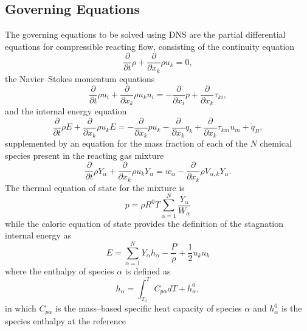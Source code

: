\documentclass[dvips]{article}
\begin{document}
\subsection{Governing Equations}
The governing equations to be solved using DNS are the partial
differential equations for compressible reacting flow,
consisting of the continuity equation
\begin{equation}
\frac{\partial}{\partial t}\rho +
\frac{\partial}{\partial x_{k}}\rho u_{k} = 0,
\label{CONTINUITY}
\end{equation}
the Navier--Stokes momentum equations
\begin{equation}
\frac{\partial}{\partial t}\rho u_{i} +
\frac{\partial}{\partial x_{k}}\rho u_{k} u_{i} =
-\frac{\partial}{\partial x_{i}}p +
\frac{\partial}{\partial x_{k}} \tau_{ki},
\label{MOMENTUM}
\end{equation}
and the internal energy equation
\begin{equation}
\frac{\partial}{\partial t}\rho E +
\frac{\partial}{\partial x_{k}}\rho u_{k} E =
-\frac{\partial}{\partial x_{k}}p u_{k} -
\frac{\partial}{\partial x_{k}} q_{k} +
\frac{\partial}{\partial x_{k}} \tau_{km}u_{m} +
\dot{q}_{R},
\label{ENERGY}
\end{equation}
supplemented by an equation for the mass fraction of each of the $N$ chemical
species present in the reacting gas mixture
\begin{equation}
\frac{\partial}{\partial t}\rho Y_{\alpha} +
\frac{\partial}{\partial x_{k}}\rho u_{k} Y_{\alpha} =
w_{\alpha} -
\frac{\partial}{\partial x_{k}}\rho V_{\alpha,k} Y_{\alpha}.
\label{MASSFRAC}
\end{equation}
The thermal equation of state for the mixture is
\begin{equation}
p = \rho R^{0} T \sum_{\alpha=1}^{N} \frac{Y_{\alpha}}{W_{\alpha}}
\end{equation}
while the caloric equation of state provides the definition of the
stagnation internal energy as 
\begin{equation}
E = \sum_{\alpha=1}^{N} Y_{\alpha} h_{\alpha} - \frac{P}{\rho} +
\frac{1}{2}u_{k}u_{k}
\label{EOSCAL}
\end{equation}
where the enthalpy of species $\alpha$ is defined as
\begin{equation}
h_{\alpha} = \int_{T_{0}}^{T} C_{p\alpha} dT + h_{\alpha}^{0},
\label{ENTH}
\end{equation}
in which $C_{p\alpha}$ is the mass--based specific heat capacity of species
$\alpha$ and $h_{\alpha}^{0}$ is the species enthalpy at the reference
\end{document}

